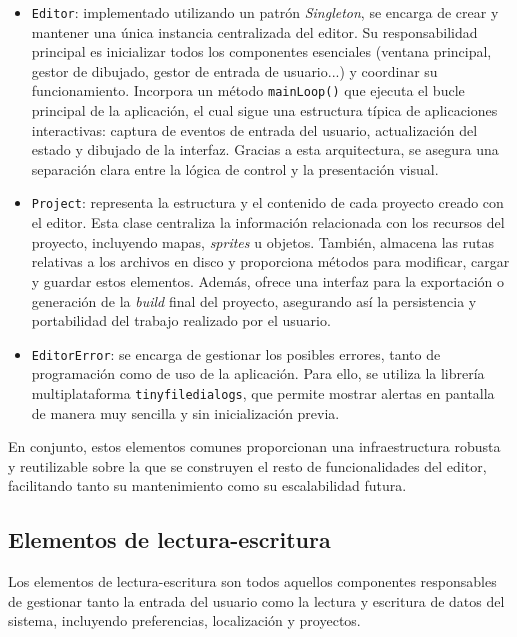 \begin{itemize}
	\item \texttt{Editor}: implementado utilizando un patrón \textit{Singleton}, se encarga de crear y mantener una única instancia centralizada del editor. Su responsabilidad principal es inicializar todos los componentes esenciales (ventana principal, gestor de dibujado, gestor de entrada de usuario...) y coordinar su funcionamiento. Incorpora un método \texttt{mainLoop()} que ejecuta el bucle principal de la aplicación, el cual sigue una estructura típica de aplicaciones interactivas: captura de eventos de entrada del usuario, actualización del estado y dibujado de la interfaz. Gracias a esta arquitectura, se asegura una separación clara entre la lógica de control y la presentación visual.
	\item \texttt{Project}: representa la estructura y el contenido de cada proyecto creado con el editor. Esta clase centraliza la información relacionada con los recursos del proyecto, incluyendo mapas, \textit{sprites} u objetos. También, almacena las rutas relativas a los archivos en disco y proporciona métodos para modificar, cargar y guardar estos elementos. Además, ofrece una interfaz para la exportación o generación de la \textit{build} final del proyecto, asegurando así la persistencia y portabilidad del trabajo realizado por el usuario.
	\item \texttt{EditorError}: se encarga de gestionar los posibles errores, tanto de programación como de uso de la aplicación. Para ello, se utiliza la librería multiplataforma \texttt{tinyfiledialogs}, que permite mostrar alertas en pantalla de manera muy sencilla y sin inicialización previa.
\end{itemize}

En conjunto, estos elementos comunes proporcionan una infraestructura robusta y reutilizable sobre la que se construyen el resto de funcionalidades del editor, facilitando tanto su mantenimiento como su escalabilidad futura.

\subsection{Elementos de lectura-escritura}
Los elementos de lectura-escritura son todos aquellos componentes responsables de gestionar tanto la entrada del usuario como la lectura y escritura de datos del sistema, incluyendo preferencias, localización y proyectos.

